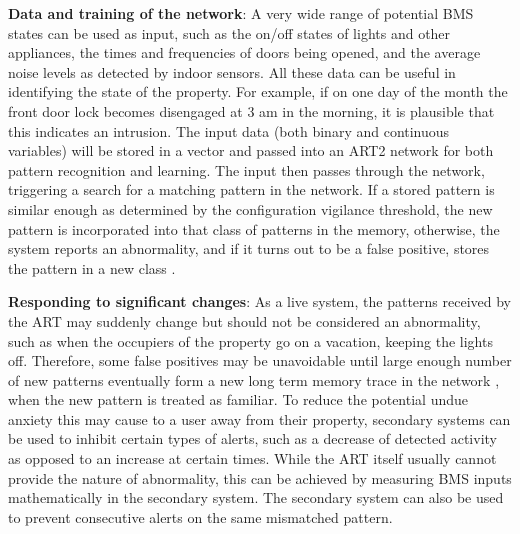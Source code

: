 \documentclass[10pt, oneside]{article}
\begin{document}
\textbf{Data and training of the network}: A very wide range of potential BMS states can be used as input, such as the on/off states of lights and other appliances, the times and frequencies of doors being opened, and the average noise levels as detected by indoor sensors. All these data can be useful in identifying the state of the property. For example, if on one day of the month the front door lock becomes disengaged at 3 am in the morning, it is plausible that this indicates an intrusion. The input data (both binary and continuous variables) will be stored in a vector and passed into an ART2 network for both pattern recognition and learning. The input then passes through the network, triggering a search for a matching pattern in the network. If a stored pattern is similar enough as determined by the configuration vigilance threshold, the new pattern is incorporated into that class of patterns in the memory, otherwise, the system reports an abnormality, and if it turns out to be a false positive, stores the pattern in a new class \cite[p. 18]{art-lecture}.

\textbf{Responding to significant changes}: As a live system, the patterns received by the ART may suddenly change but should not be considered an abnormality, such as when the occupiers of the property go on a vacation, keeping the lights off. Therefore, some false positives may be unavoidable until large enough number of new patterns eventually form a new long term memory trace in the network \cite[p. 7]{art-lecture}, when the new pattern is treated as familiar. To reduce the potential undue anxiety this may cause to a user away from their property, secondary systems can be used to inhibit certain types of alerts, such as a decrease of detected activity as opposed to an increase at certain times. While the ART itself usually cannot provide the nature of abnormality, this can be achieved by measuring BMS inputs mathematically in the secondary system. The secondary system can also be used to prevent consecutive alerts on the same mismatched pattern.


\footnotesize{}
\end{document}
